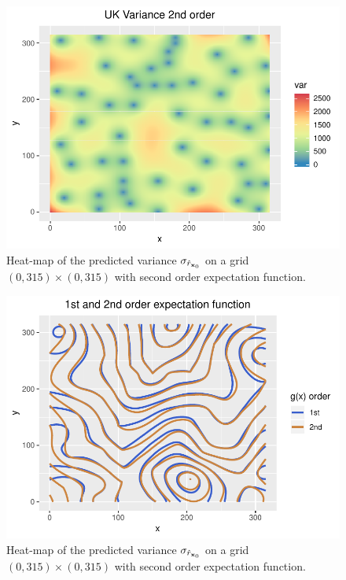 \begin{figure}[htb]
    \centering
    \includegraphics{figures/uk2se.pdf}
    \caption{Heat-map of the predicted variance $\sigma_{\hat{r}_{\boldsymbol{\mathbf{x}}_0}}$ on a grid $(0,315)\times(0,315)$ with second order expectation function.}
    \label{fig:uk2se}
\end{figure}

\begin{figure}[htb]
    \centering
    \includegraphics{figures/uk1n2.pdf}
    \caption{Heat-map of the predicted variance $\sigma_{\hat{r}_{\boldsymbol{\mathbf{x}}_0}}$ on a grid $(0,315)\times(0,315)$ with second order expectation function.}
    \label{fig:uk1n2}
\end{figure}

